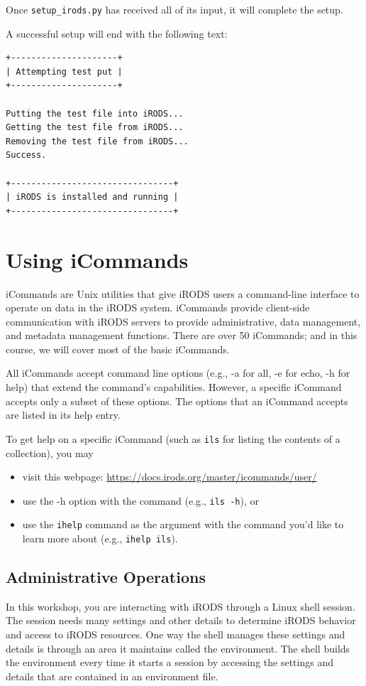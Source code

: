 \documentclass[10pt,oneside]{memoir}
\begin{document}
Once \texttt{setup\_irods.py} has received all of its input, it will complete the setup.

A successful setup will end with the following text:

\begin{lstlisting}
+---------------------+
| Attempting test put |
+---------------------+

Putting the test file into iRODS...
Getting the test file from iRODS...
Removing the test file from iRODS...
Success.

+--------------------------------+
| iRODS is installed and running |
+--------------------------------+
\end{lstlisting}

\chapter{Using iCommands}

iCommands are Unix utilities that give iRODS users a command-line interface to operate on data in the iRODS system. iCommands provide client-side communication with iRODS servers to provide administrative, data management, and metadata management functions. There are over 50 iCommands; and in this course, we will cover most of the basic iCommands.

All iCommands accept command line options (e.g., -a for all, -e for echo, -h for help) that extend the command's capabilities. However, a specific iCommand accepts only a subset of these options. The options that an iCommand accepts are listed in its help entry.

To get help on a specific iCommand (such as \texttt{ils} for listing the contents of a collection), you may
\begin{itemize}
 \item visit this webpage: \url{https://docs.irods.org/master/icommands/user/}
 \item use the -h option with the command (e.g., \texttt{ils -h}), or
 \item use the \texttt{ihelp} command as the argument with the command you'd like to learn more
         about (e.g., \texttt{ihelp ils}).
\end{itemize}

\section{Administrative Operations}
In this workshop, you are interacting with iRODS through a Linux shell session. The session needs many settings and other details to determine iRODS behavior and access to iRODS resources. One way the shell manages these settings and details is through an area it maintains called the environment. The shell builds the environment every time it starts a session by accessing the settings and details that are contained in an environment file.
\end{document}
